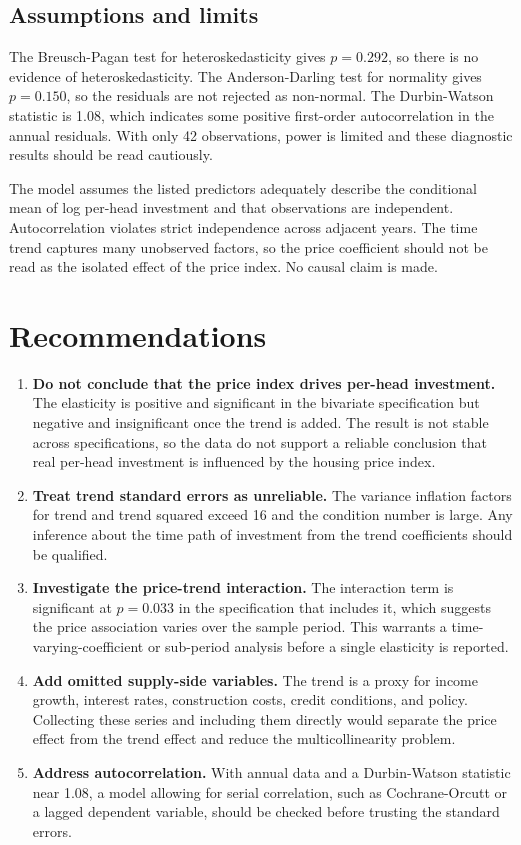 \documentclass[conference]{IEEEtran}
\begin{document}
\subsection{Assumptions and limits}
The Breusch-Pagan test for heteroskedasticity gives $p=0.292$, so there is no evidence of heteroskedasticity. The Anderson-Darling test for normality gives $p=0.150$, so the residuals are not rejected as non-normal. The Durbin-Watson statistic is 1.08, which indicates some positive first-order autocorrelation in the annual residuals. With only 42 observations, power is limited and these diagnostic results should be read cautiously.

The model assumes the listed predictors adequately describe the conditional mean of log per-head investment and that observations are independent. Autocorrelation violates strict independence across adjacent years. The time trend captures many unobserved factors, so the price coefficient should not be read as the isolated effect of the price index. No causal claim is made.

\section{Recommendations}
\begin{enumerate}
\item \textbf{Do not conclude that the price index drives per-head investment.} The elasticity is positive and significant in the bivariate specification but negative and insignificant once the trend is added. The result is not stable across specifications, so the data do not support a reliable conclusion that real per-head investment is influenced by the housing price index.
\item \textbf{Treat trend standard errors as unreliable.} The variance inflation factors for trend and trend squared exceed 16 and the condition number is large. Any inference about the time path of investment from the trend coefficients should be qualified.
\item \textbf{Investigate the price-trend interaction.} The interaction term is significant at $p=0.033$ in the specification that includes it, which suggests the price association varies over the sample period. This warrants a time-varying-coefficient or sub-period analysis before a single elasticity is reported.
\item \textbf{Add omitted supply-side variables.} The trend is a proxy for income growth, interest rates, construction costs, credit conditions, and policy. Collecting these series and including them directly would separate the price effect from the trend effect and reduce the multicollinearity problem.
\item \textbf{Address autocorrelation.} With annual data and a Durbin-Watson statistic near 1.08, a model allowing for serial correlation, such as Cochrane-Orcutt or a lagged dependent variable, should be checked before trusting the standard errors.
\end{enumerate}
\end{document}
